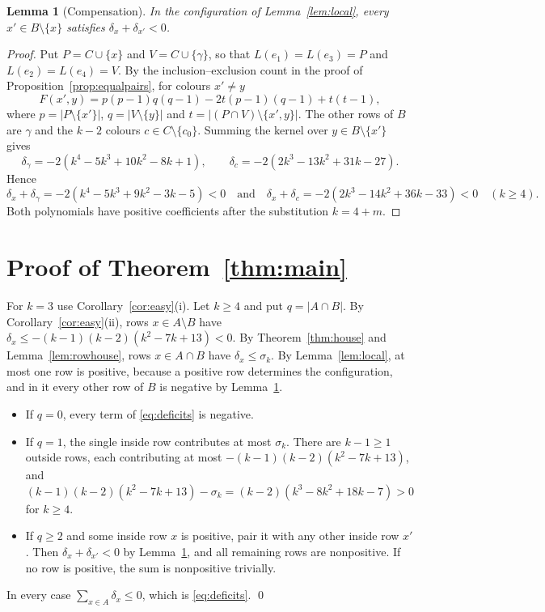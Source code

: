 \documentclass[11pt]{amsart}
\newtheorem{lemma}[theorem]{Lemma}
\theoremstyle{definition}
\theoremstyle{remark}
\newcommand{\1}{\mathbf 1}
\begin{document}
\begin{lemma}[Compensation]\label{lem:pair}
In the configuration of Lemma~\ref{lem:local}, every $x'\in B\setminus\{x\}$ satisfies
$\delta_x+\delta_{x'}<0$.
\end{lemma}
\begin{proof}
Put $P=C\cup\{x\}$ and $V=C\cup\{\gamma\}$, so that $L(e_1)=L(e_3)=P$ and $L(e_2)=L(e_4)=V$. By the
inclusion--exclusion count in the proof of Proposition~\ref{prop:equalpairs}, for colours $x'\ne y$
\[
F(x',y)=p(p-1)q(q-1)-2t(p-1)(q-1)+t(t-1),
\]
where $p=|P\setminus\{x'\}|$, $q=|V\setminus\{y\}|$ and $t=|(P\cap V)\setminus\{x',y\}|$. The other rows of $B$ are $\gamma$ and the $k-2$ colours
$c\in C\setminus\{c_0\}$. Summing the kernel over $y\in B\setminus\{x'\}$ gives
\[
\delta_\gamma=-2(k^4-5k^3+10k^2-8k+1),\qquad \delta_c=-2(2k^3-13k^2+31k-27).
\]
Hence
\[
\delta_x+\delta_\gamma=-2(k^4-5k^3+9k^2-3k-5)<0\quad\text{and}\quad
\delta_x+\delta_c=-2(2k^3-14k^2+36k-33)<0\quad(k\ge4).
\]
Both polynomials have positive coefficients after the substitution $k=4+m$.
\end{proof}

\section{Proof of Theorem~\ref{thm:main}}\label{sec:proof}

For $k=3$ use Corollary~\ref{cor:easy}(i). Let $k\ge4$ and put $q=|A\cap B|$. By
Corollary~\ref{cor:easy}(ii), rows $x\in A\setminus B$ have
$\delta_x\le-(k-1)(k-2)(k^2-7k+13)<0$. By Theorem~\ref{thm:house} and Lemma~\ref{lem:rowhouse}, rows
$x\in A\cap B$ have $\delta_x\le\sigma_k$. By Lemma~\ref{lem:local}, at most one row is positive, because
a positive row determines the configuration, and in it every other row of $B$ is negative by
Lemma~\ref{lem:pair}.
\begin{itemize}
\item If $q=0$, every term of \eqref{eq:deficits} is negative.
\item If $q=1$, the single inside row contributes at most $\sigma_k$. There are $k-1\ge1$ outside rows,
  each contributing at most $-(k-1)(k-2)(k^2-7k+13)$, and
  $(k-1)(k-2)(k^2-7k+13)-\sigma_k=(k-2)(k^3-8k^2+18k-7)>0$ for $k\ge4$.
\item If $q\ge2$ and some inside row $x$ is positive, pair it with any other inside row $x'$. Then
  $\delta_x+\delta_{x'}<0$ by Lemma~\ref{lem:pair}, and all remaining rows are nonpositive. If no row is
  positive, the sum is nonpositive trivially.
\end{itemize}
In every case $\sum_{x\in A}\delta_x\le0$, which is \eqref{eq:deficits}. \qed
\end{document}
